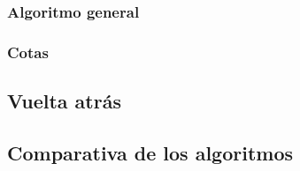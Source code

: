 \subsubsection{Algoritmo general}


\subsubsection{Cotas}


\subsection{Vuelta atrás}


\subsection{Comparativa de los algoritmos}

